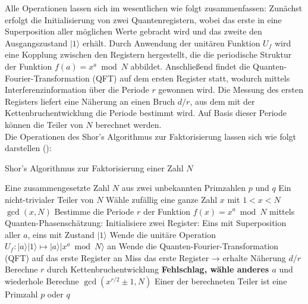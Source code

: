 \noindent
Alle Operationen lassen sich im wesentlichen wie folgt zusammenfassen: Zunächst erfolgt die Initialisierung von zwei Quantenregistern, wobei das erste in eine Superposition aller möglichen Werte gebracht wird und das zweite den Ausgangszustand \( |1\rangle \) erhält. Durch Anwendung der unitären Funktion \( U_f \) wird eine Kopplung zwischen den Registern hergestellt, die die periodische Struktur der Funktion \( f(a) = x^a \bmod N \) abbildet. Anschließend findet die Quanten-Fourier-Transformation (QFT) auf dem ersten Register statt, wodurch mittels Interferenzinformation über die Periode \( r \) gewonnen wird. Die Messung des ersten Registers liefert eine Näherung an einen Bruch \( d/r \), aus dem mit der Kettenbruchentwicklung die Periode bestimmt wird. Auf Basis dieser Periode können die Teiler von \( N \) berechnet werden. \\

\noindent Die Operationen des Shor's Algorithmus zur Faktorisierung lassen sich wie folgt darstellen (\cite[15-19]{shor_polynomial-time_1994}):

\begin{algorithm}[H] %
\caption{Shor's Algorithmus zur Faktorisierung einer Zahl \( N \)}
\label{algorithm:shor}
\begin{algorithmic}[1]
\Require Eine zusammengesetzte Zahl \( N \) aus zwei unbekannten Primzahlen \( p \) und \( q \)
\Ensure Ein nicht-trivialer Teiler von \( N \)
\State Wähle zufällig eine ganze Zahl \( x \) mit \( 1 < x < N \)
    \State \Return \( \gcd(x, N) \) 
\EndIf
\State Bestimme die Periode \( r \) der Funktion \( f(x) = x^a \bmod N \) mittels Quanten-Phasenschätzung:
\State Initialisiere zwei Register: Eins mit Superposition aller \( a \), eins mit Zustand \( |1\rangle \)
\State Wende die unitäre Operation \( U_f \colon |a\rangle|1\rangle \mapsto |a\rangle|x^a \bmod N\rangle \) an
\State Wende die Quanten-Fourier-Transformation (QFT) auf das erste Register an
\State Miss das erste Register → erhalte Näherung \( d/r \)
\State Berechne \( r \) durch Kettenbruchentwicklung
    \State \Return \textbf{Fehlschlag, wähle anderes \( a \)} und wiederhole
\EndIf
\State Berechne \( \gcd(x^{r/2} \pm 1, N) \)
\State \Return Einer der berechneten Teiler ist eine Primzahl \( p \) oder \( q \)
\end{algorithmic}
\end{algorithm}

